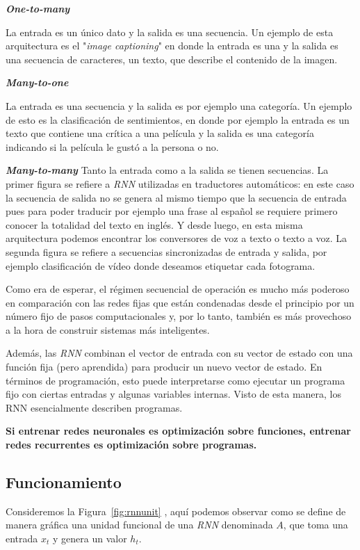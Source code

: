\documentclass[a4paper,12pt]{article}
\begin{document}
\textbf{\textit{One-to-many}}

La entrada es un único dato y la salida es una secuencia. Un ejemplo de esta arquitectura es el "\textit{image captioning}" en donde la entrada es una y la salida es una secuencia de caracteres, un texto, que describe el contenido de la imagen. 

\textbf{\textit{Many-to-one}}

La entrada es una secuencia y la salida es por ejemplo una categoría. Un ejemplo de esto es la clasificación de sentimientos, en donde por ejemplo la entrada es un texto que contiene una crítica a una película y la salida es una categoría indicando si la película le gustó a la persona o no.

\textbf{\textit{Many-to-many}}
Tanto la entrada como a la salida se tienen secuencias. La primer figura se refiere a \textit{RNN} utilizadas en traductores automáticos: en este caso la secuencia de salida no se genera al mismo tiempo que la secuencia de entrada pues para poder traducir por ejemplo una frase al español se requiere primero conocer la totalidad del texto en inglés. Y desde luego, en esta misma arquitectura podemos encontrar los conversores de voz a texto o texto a voz.
La segunda figura se refiere a secuencias sincronizadas de entrada y salida, por ejemplo clasificación de vídeo donde deseamos etiquetar cada fotograma.

Como era de esperar, el régimen secuencial de operación es mucho más poderoso en comparación con las redes fijas que están condenadas desde el principio por un número fijo de pasos computacionales y, por lo tanto, también es más provechoso a la hora de construir sistemas más inteligentes. 

Además, las \textit{RNN} combinan el vector de entrada con su vector de estado con una función fija (pero aprendida) para producir un nuevo vector de estado. En términos de programación, esto puede interpretarse como ejecutar un programa fijo con ciertas entradas y algunas variables internas. Visto de esta manera, los RNN esencialmente describen programas.

\textbf{Si entrenar redes neuronales es optimización sobre funciones, entrenar redes recurrentes es optimización sobre programas.}

\subsection{Funcionamiento}

Consideremos la Figura~\ref{fig:rnnunit} \citep{olahlstm}, aquí podemos observar como se define de manera gráfica una unidad funcional de una \textit{RNN} denominada $A$, que toma una entrada $x_t$ y genera un valor $h_t$.
\end{document}
